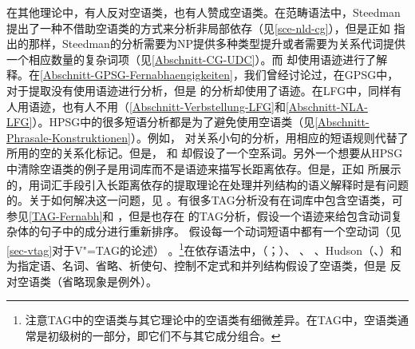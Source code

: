 在其他理论中，有人反对空语类，也有人赞成空语类。在范畴语法\indexcgc 中，Steedman提出了一种不借助空语类的方式来分析非局部依存（见\ref{sce-nld-cg}），但是正如 \citet{Pollard88a}指出的那样，Steedman的分析需要为NP提供多种类型提升或者需要为关系代词提供一个相应数量的复杂词项（见\ref{Abschnitt-CG-UDC}）。而 \citet{KoenigE99a-u}却使用语迹进行了解释。在\ref{Abschnitt-GPSG-Fernabhaengigkeiten}，我们曾经讨论过，在GPSG\indexgpsgc 中， \citet[--77]{Uszkoreit87a}对于提取没有使用语迹进行分析，但是 \citet*[]{GKPS85a}的分析却使用了语迹。在LFG\indexlfgc 中，同样有人用语迹\citep[]{Bresnan2001a}，也有人不用（\ref{Abschnitt-Verbstellung-LFG}和\ref{Abschnitt-NLA-LFG}）。HPSG\indexhpsgc 中的很多短语分析都是为了避免使用空语类（见\ref{Abschnitt-Phrasale-Konstruktionen}）。例如， \citet{Sag97a}对关系小句的分析，用相应的短语规则代替了 所用的空的关系化标记。但是， 和 却假设了一个空系词。另外一个想要从HPSG中清除空语类的例子是用词库而不是语迹来描写长距离依存\citep*{BMS2001a}。但是，正如  \citet{LH2006a}所展示的，用词汇手段引入长距离依存的提取理论在处理并列结构的语义解释时是有问题的。关于如何解决这一问题，见 。有很多TAG分析\indextagc 没有在词库中包含空语类，可参见\ref{TAG-Fernabh}和 ，但是也存在 \citet[]{Kallmeyer2005a-u}的TAG分析，假设一个语迹来给包含动词复杂体的句子中的成分进行重新排序。 \citet[--11]{Rambow94a}假设每一个动词短语中都有一个空动词（见\ref{sec-vtag}对于V"=TAG的论述） 。\footnote{%
注意TAG中的空语类与其它理论中的空语类有细微差异。在TAG中，空语类通常是初级树的一部分，即它们不与其它成分组合。  
}在依存语法中，\mel （\citeyear[]{Melcuk88a-u}；\citeyear[]{Melcuk2003a-u}）、 \citet[]{Starosta88a-u}、 \citet[--472]{Eroms2000a}、Hudson（\citeyear[\S~3.7]{Hudson2007a-u}、\citeyear[]{Hudson2010b-u}）和 \citet{Engel2014a}为指定语、名词、省略、祈使句、控制不定式和并列结构假设了空语类，但是 \citet[]{GO2009a}反对空语类（省略现象是例外\citealp{Osborne2016a-u}）。
